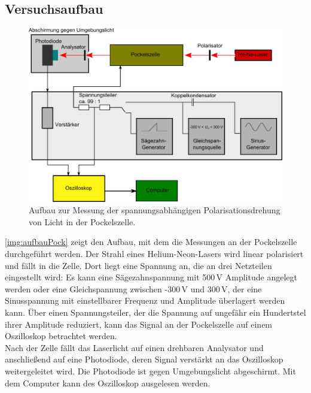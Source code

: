 \subsection{Versuchsaufbau}
\begin{figure}[H]
\begin{center}
  \includegraphics[width=\textwidth]{../img/aufbauPock.pdf}
  \caption{Aufbau zur Messung der spannungsabhängigen Polarisationsdrehung von Licht in der Pockelszelle.}
  \label{img:aufbauPock}
\end{center}
\end{figure}
\autoref{img:aufbauPock} zeigt den Aufbau, mit dem die Messungen an der Pockelszelle durchgeführt werden.
Der Strahl eines Helium-Neon-Lasers wird linear polarisiert und fällt in die Zelle.
Dort liegt eine Spannung an, die an drei Netzteilen eingestellt wird:
Es kann eine Sägezahnspannung mit 500\,V Amplitude angelegt werden oder
eine Gleichspannung zwischen -300\,V und 300\,V,
der eine Sinusspannung mit einstellbarer Frequenz und Amplitude überlagert werden kann.
Über einen Spannungsteiler, der die Spannung auf ungefähr ein Hundertstel ihrer Amplitude reduziert,
kann das Signal an der Pockelszelle auf einem Oszilloskop betrachtet werden.\\
Nach der Zelle fällt das Laserlicht auf einen drehbaren Analysator und anschließend auf eine Photodiode,
deren Signal verstärkt an das Oszilloskop weitergeleitet wird.
Die Photodiode ist gegen Umgebungslicht abgeschirmt.
Mit dem Computer kann des Oszilloskop ausgelesen werden.